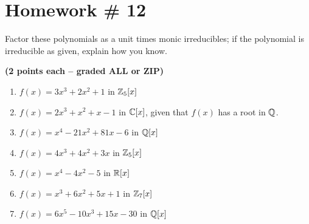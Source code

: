 \section{Homework \# 12}
\label{sec:HW12}
Factor these polynomials as a unit times monic irreducibles; if the polynomial is irreducible as given, explain how you know.  \\ \steezybreak

    \textbf{(2 points each – graded ALL or ZIP)} \\ \steezybreak
    
    \begin{enumerate}
        \setlength{\itemsep}{15pt} %
        \item $f(x) = 3x^3 + 2x^2 + 1$ in ${\mathbb{Z}}_5[x]$
        \item $f(x) = 2x^3 + x^2 + x - 1$ in ${\mathbb{C}}[x]$, given that $f(x)$ has a root in ${\mathbb{Q}}$.
        \item $f(x) = x^4 - 21x^2 + 81x - 6$ in ${\mathbb{Q}}[x]$
        \item $f(x) = 4x^3 + 4x^2 + 3x$ in ${\mathbb{Z}}_5[x]$
        \item $f(x) = x^4 - 4x^2 - 5$ in ${\mathbb{R}}[x]$
        \item $f(x) = x^3 + 6x^2 + 5x + 1$ in ${\mathbb{Z}}_7[x]$
        \item $f(x) = 6x^5 - 10x^3 + 15x - 30$ in ${\mathbb{Q}}[x]$
    \end{enumerate}

